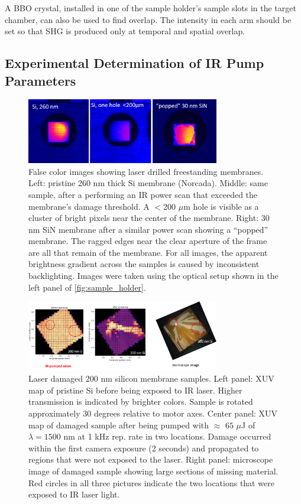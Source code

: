 A BBO crystal, installed in one of the sample holder's sample slots in the target chamber, can also be used to find overlap. The intensity in each arm should be set so that SHG is produced only at temporal and spatial overlap.

\subsection{Experimental Determination of IR Pump Parameters}

\begin{figure}
	\centering
	\includegraphics[width=0.75\textwidth]{figures/chap3/sample_damage.png}
	\caption{False color images showing laser drilled freestanding membranes. Left: pristine 260 nm thick Si membrane (Norcada). Middle: same sample, after a performing an IR power scan that exceeded the membrane's damage threshold. A $<$200 $\mu$m hole is visible as a cluster of bright pixels near the center of the membrane. Right: 30 nm SiN membrane after a similar power scan showing a ``popped'' membrane. The ragged edges near the clear aperture of the frame are all that remain of the membrane. For all images, the apparent brightness gradient across the samples is caused by inconsistent backlighting. Images were taken using the optical setup shown in the left panel of \cref{fig:sample_holder}.}
	\label{fig:sample_damage}
\end{figure}

\begin{figure}
	\centering
	\includegraphics[width=0.75\textwidth]{figures/chap3/Si_damage.png}
	\caption{Laser damaged 200 nm silicon membrane samples. Left panel: XUV map of pristine Si before being exposed to IR laser. Higher transmission is indicated by brighter colors. Sample is rotated approximately 30 degrees relative to motor axes. Center panel: XUV map of damaged sample after being pumped with $\approx \text{ 65 }\mu$J of $\lambda = 1500 \text{ nm}$ at 1 kHz rep. rate in two locations. Damage occurred within the first camera exposure (2 seconds) and propagated to regions that were not exposed to the laser. Right panel: microscope image of damaged sample showing large sections of missing material. Red circles in all three pictures indicate the two locations that were exposed to IR laser light.}
	\label{fig:Si_damage}
\end{figure}

